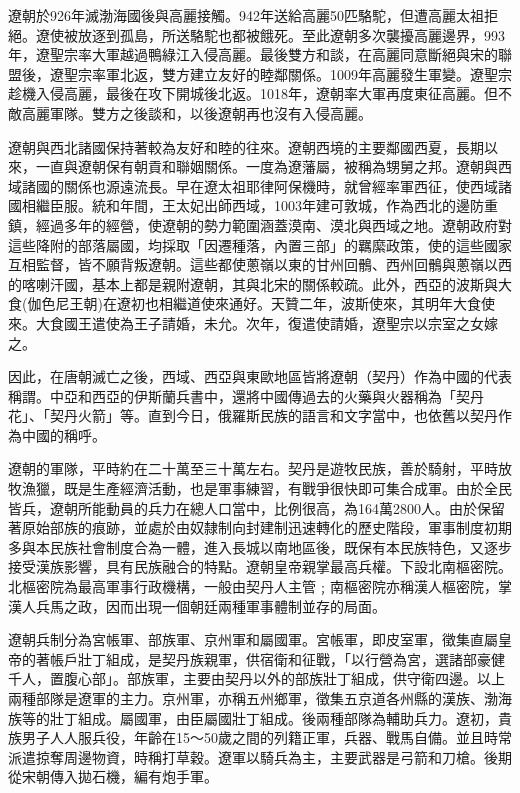 遼朝於926年滅渤海國後與高麗接觸。942年送給高麗50匹駱駝，但遭高麗太祖拒絕。遼使被放逐到孤島，所送駱駝也都被餓死。至此遼朝多次襲擾高麗邊界，993年，遼聖宗率大軍越過鴨綠江入侵高麗。最後雙方和談，在高麗同意斷絕與宋的聯盟後，遼聖宗率軍北返，雙方建立友好的睦鄰關係。1009年高麗發生軍變。遼聖宗趁機入侵高麗，最後在攻下開城後北返。1018年，遼朝率大軍再度東征高麗。但不敵高麗軍隊。雙方之後談和，以後遼朝再也沒有入侵高麗。

遼朝與西北諸國保持著較為友好和睦的往來。遼朝西境的主要鄰國西夏，長期以來，一直與遼朝保有朝貢和聯姻關係。一度為遼藩屬，被稱為甥舅之邦。遼朝與西域諸國的關係也源遠流長。早在遼太祖耶律阿保機時，就曾經率軍西征，使西域諸國相繼臣服。統和年間，王太妃出師西域，1003年建可敦城，作為西北的邊防重鎮，經過多年的經營，使遼朝的勢力範圍涵蓋漠南、漠北與西域之地。遼朝政府對這些降附的部落屬國，均採取「因遷種落，內置三部」的羈縻政策，使的這些國家互相監督，皆不願背叛遼朝。這些都使蔥嶺以東的甘州回鶻、西州回鶻與蔥嶺以西的喀喇汗國，基本上都是親附遼朝，其與北宋的關係較疏。此外，西亞的波斯與大食(伽色尼王朝)在遼初也相繼道使來通好。天贊二年，波斯使來，其明年大食使來。大食國王遣使為王子請婚，未允。次年，復遣使請婚，遼聖宗以宗室之女嫁之。

因此，在唐朝滅亡之後，西域、西亞與東歐地區皆將遼朝（契丹）作為中國的代表稱謂。中亞和西亞的伊斯蘭兵書中，還將中國傳過去的火藥與火器稱為「契丹花」、「契丹火箭」等。直到今日，俄羅斯民族的語言和文字當中，也依舊以契丹作為中國的稱呼。

遼朝的軍隊，平時約在二十萬至三十萬左右。契丹是遊牧民族，善於騎射，平時放牧漁獵，既是生產經濟活動，也是軍事練習，有戰爭很快即可集合成軍。由於全民皆兵，遼朝所能動員的兵力在總人口當中，比例很高，為164萬2800人。由於保留著原始部族的痕跡，並處於由奴隸制向封建制迅速轉化的歷史階段，軍事制度初期多與本民族社會制度合為一體，進入長城以南地區後，既保有本民族特色，又逐步接受漢族影響，具有民族融合的特點。遼朝皇帝親掌最高兵權。下設北南樞密院。北樞密院為最高軍事行政機構，一般由契丹人主管﹔南樞密院亦稱漢人樞密院，掌漢人兵馬之政，因而出現一個朝廷兩種軍事體制並存的局面。 　

遼朝兵制分為宮帳軍、部族軍、京州軍和屬國軍。宮帳軍，即皮室軍，徵集直屬皇帝的著帳戶壯丁組成，是契丹族親軍，供宿衛和征戰，「以行營為宮，選諸部豪健千人，置腹心部」。部族軍，主要由契丹以外的部族壯丁組成，供守衛四邊。以上兩種部隊是遼軍的主力。京州軍，亦稱五州鄉軍，徵集五京道各州縣的漢族、渤海族等的壯丁組成。屬國軍，由臣屬國壯丁組成。後兩種部隊為輔助兵力。遼初，貴族男子人人服兵役，年齡在15～50歲之間的列籍正軍，兵器、戰馬自備。並且時常派遣掠奪周邊物資，時稱打草穀。遼軍以騎兵為主，主要武器是弓箭和刀槍。後期從宋朝傳入拋石機，編有炮手軍。

